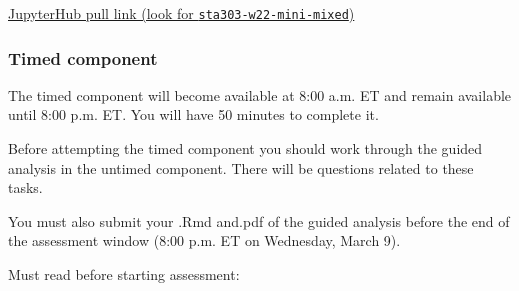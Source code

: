\documentclass[
  openany]{book}
\begin{document}
\href{https://jupyter.utoronto.ca/hub/user-redirect/git-pull?repo=https\%3A\%2F\%2Fgithub.com\%2Fsta303-bolton\%2Fsta303-w22-mini-mixed\&urlpath=rstudio\%2F}{JupyterHub pull link (look for \texttt{sta303-w22-mini-mixed})}

\hypertarget{timed-component}{%
\subsubsection{Timed component}\label{timed-component}}

The timed component will become available at 8:00 a.m. ET and remain available until 8:00 p.m. ET. You will have 50 minutes to complete it.

Before attempting the timed component you should work through the guided analysis in the untimed component. There will be questions related to these tasks.

You must also submit your .Rmd and.pdf of the guided analysis before the end of the assessment window (8:00 p.m. ET on Wednesday, March 9).

Must read before starting assessment:
\end{document}
